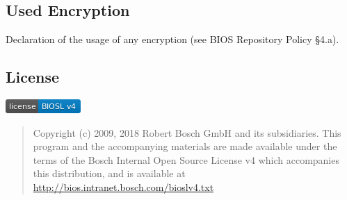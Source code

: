 \hypertarget{used-encryption}{%
\subsection{Used Encryption}\label{used-encryption}}

Declaration of the usage of any encryption (see BIOS Repository Policy
§4.a).

\hypertarget{license}{%
\subsection{License}\label{license}}
\protect\hyperlink{license}{\includegraphics{pictures/bioslv4-badge.png}}

\begin{quote}
Copyright (c) 2009, 2018 Robert Bosch GmbH and its subsidiaries. This
program and the accompanying materials are made available under the
terms of the Bosch Internal Open Source License v4 which accompanies
this distribution, and is available at
\url{http://bios.intranet.bosch.com/bioslv4.txt}
\end{quote}
